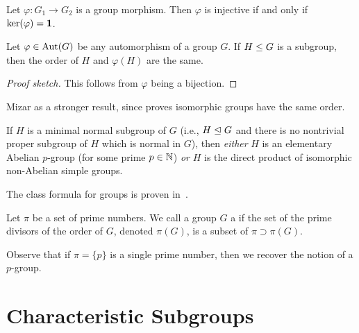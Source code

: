 \begin{theorem}
  Let $\varphi\colon G_{1}\to G_{2}$ is a group morphism.
  Then $\varphi$ is injective if and only if $\ker(\varphi)=\mathbf{1}$.
\end{theorem}


\begin{theorem}\label{thm:pure-math:iso-subgroups-have-same-order}
  Let $\varphi\in\operatorname{Aut}(G)$ be any automorphism of a group $G$.
  If $H\leq G$ is a subgroup, then the order of $H$ and
  $\varphi(H)$ are the same.
\end{theorem}

\begin{proof}[Proof sketch]
This follows from $\varphi$ being a bijection.
\end{proof}

\begin{thm-remark}
Mizar as a stronger result, since
\cite[Th73]{group6} proves isomorphic groups have the same order.
\end{thm-remark}

\begin{theorem}
  If $H$ is a minimal normal subgroup of $G$ (i.e., $H\trianglelefteq G$
  and there is no nontrivial proper subgroup of $H$ which is normal in
  $G$),
  then \emph{either} $H$ is an elementary Abelian $p$-group (for some
  prime $p\in\mathbb{N}$) \emph{or} $H$ is the direct product of isomorphic
  non-Abelian simple groups.
\end{theorem}

\begin{proposition}
The class formula for groups is proven in~.
\end{proposition}

\begin{definition}
Let $\pi$ be a set of prime numbers. We call a group $G$ a
 if the set of the prime divisors of the order of
$G$, denoted $\pi(G)$, is a subset of $\pi\supset\pi(G)$.
\end{definition}

Observe that if $\pi=\{p\}$ is a single prime number, then we recover
the notion of a $p$-group.

\section{Characteristic Subgroups}

